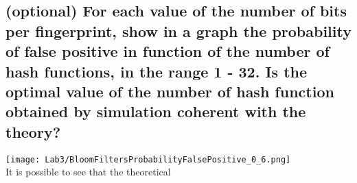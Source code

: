 \documentclass[twocolumn,letterpaper]{report}
\begin{document}
{%


				\subsection{(optional) For each value of the number of bits per fingerprint, show in a graph the probability of false positive in function of the number of hash functions, in the range 1 - 32. Is the optimal value of the number of hash function obtained by simulation coherent with the theory?}
				\texttt{[image: Lab3/BloomFiltersProbabilityFalsePositive\_0\_6.png]} \\
				It is possible to see that the theoretical
				
}
\end{document}
